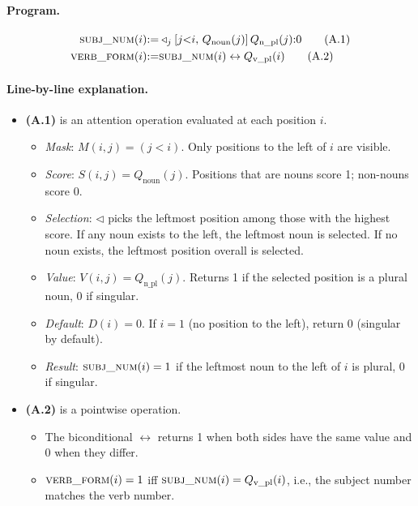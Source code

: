 \documentclass[11pt]{article}
\begin{document}
\paragraph{Program.}
\begin{align}
\textsc{subj\_num}(i) &{:=} \triangleleft_j[j{<}i,\, Q_\text{noun}(j)]\, Q_\text{n\_pl}(j) {:} 0 \tag{A.1} \\
\textsc{verb\_form}(i) &{:=} \textsc{subj\_num}(i) \leftrightarrow Q_\text{v\_pl}(i) \tag{A.2}
\end{align}

\paragraph{Line-by-line explanation.}
\begin{itemize}[itemsep=3pt,leftmargin=*]
    \item \textbf{(A.1)} is an attention operation evaluated at each position $i$.
    \begin{itemize}[itemsep=1pt,leftmargin=*]
        \item \textit{Mask}: $M(i,j) = (j < i)$. Only positions to the left of $i$ are visible.
        \item \textit{Score}: $S(i,j) = Q_\text{noun}(j)$. Positions that are nouns score 1; non-nouns score 0.
        \item \textit{Selection}: $\triangleleft$ picks the leftmost position among those with the highest score. If any noun exists to the left, the leftmost noun is selected. If no noun exists, the leftmost position overall is selected.
        \item \textit{Value}: $V(i,j) = Q_\text{n\_pl}(j)$. Returns 1 if the selected position is a plural noun, 0 if singular.
        \item \textit{Default}: $D(i) = 0$. If $i = 1$ (no position to the left), return 0 (singular by default).
        \item \textit{Result}: $\textsc{subj\_num}(i) = 1$ if the leftmost noun to the left of $i$ is plural, $0$ if singular.
    \end{itemize}
    \item \textbf{(A.2)} is a pointwise operation.
    \begin{itemize}[itemsep=1pt,leftmargin=*]
        \item The biconditional $\leftrightarrow$ returns 1 when both sides have the same value and 0 when they differ.
        \item $\textsc{verb\_form}(i) = 1$ iff $\textsc{subj\_num}(i) = Q_\text{v\_pl}(i)$, i.e., the subject number matches the verb number.
    \end{itemize}
\end{itemize}
\end{document}
